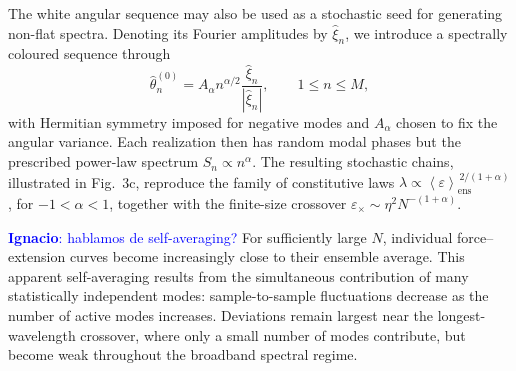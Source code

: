 \documentclass[pdflatex, twocolumn, sn-nature]{sn-jnl}
\newcommand{\ign}[1]{\textcolor{blue}{\textbf{Ignacio}: #1}}
\begin{document}
The white angular sequence may also be used as a stochastic seed for
generating non-flat spectra. Denoting its Fourier amplitudes by
$\widehat{\xi}_n$, we introduce a spectrally coloured sequence through
\begin{equation}
    \widehat{\theta}^{(0)}_n
    =
    A_\alpha n^{\alpha/2}
    \frac{\widehat{\xi}_n}{|\widehat{\xi}_n|},
    \qquad 1\leq n\leq M,
\end{equation}
with Hermitian symmetry imposed for negative modes and $A_\alpha$
chosen to fix the angular variance. Each realization then has random
modal phases but the prescribed power-law spectrum
$S_n\propto n^\alpha$. The resulting stochastic chains, illustrated in
Fig.~3c, reproduce the family of constitutive laws $\lambda
    \propto
    \left\langle\varepsilon\right\rangle_{\mathrm{ens}}^{\,2/(1+\alpha)}
     $, for $-1<\alpha<1$, 
together with the finite-size crossover
$\varepsilon_\times\sim\eta^2N^{-(1+\alpha)}$.

\ign{hablamos de self-averaging?}
For sufficiently large $N$, individual force--extension curves become
increasingly close to their ensemble average. This apparent
self-averaging results from the simultaneous contribution of many
statistically independent modes: sample-to-sample fluctuations decrease
as the number of active modes increases. Deviations remain largest near
the longest-wavelength crossover, where only a small number of modes
contribute, but become weak throughout the broadband spectral regime.


\end{document}
